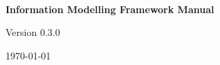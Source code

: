 \begin{titlepage}
  \centering
  {~ \par}
  \vspace{5.5cm}
  {\Huge\bfseries Information Modelling Framework Manual\par}
  \vspace{2cm}
  {\Large Version 0.3.0\par}
  \vfill        
  {\large \today\par}
\end{titlepage}
